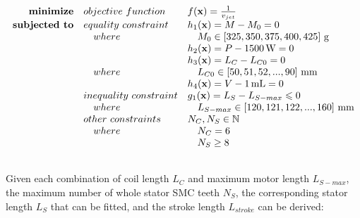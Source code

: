                 
                \begin{equation}
                    \begin{array}{rll}
                        \textbf{minimize}       & \small{objective\,\,function}     & f(\textbf{x})=\frac{1}{v_{jet}} \\
                        \textbf{subjected to}   & \small{equality\,\,constraint}    & h_1(\textbf{x})=M - M_0= 0\\
                                                &\quad \small{where}                &\quad  M_0\in\left[325,350,375,400,425\right]\,\mathrm{g}\\
                                                &                                   & h_2(\textbf{x})=P - 1500\,\mathrm{W}=0\\
                                                &                                   & h_3(\textbf{x})=L_C - L_{C0} = 0\\
                                                &\quad \small{where}                &\quad  L_{C0}\in\left[50,51,52,...,90\right]\,\mathrm{mm}\\
                                                &                                   & h_4(\textbf{x})=V - 1\,\mathrm{mL} = 0\\
                                                & \small{inequality\,\,constraint}  & g_1(\textbf{x})=L_S-L_{S-max} \leqslant 0\\
                                                &\quad \small{where}                &\quad L_{S-max} \in \left[120,121,122,...,160\right]\,\mathrm{mm} \\
                                                & \small{other\,\,constraints}       & N_C, N_S \in 	\mathbb{N} \\ 
                                                &\quad \small{where}                &\quad N_C = 6\\
                                                &                                   &\quad N_S \geq 8
                                                \\ \\
                    \end{array}
                    \label{eq:outer optimization for LFSMs}
                \end{equation}
                
                
                
                Given each combination of coil length $L_{C}$ and maximum motor length $L_{S-max}$, the maximum number of whole stator \acs{SMC} teeth $N_S$, the corresponding stator length $L_S$ that can be fitted, and the stroke length $L_{stroke}$ can be derived:


